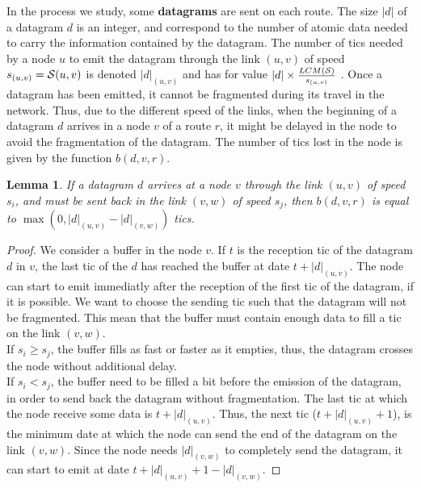 \documentclass[10pt]{article}
\newtheorem{lemma}[theorem]{Lemma}
\begin{document}
        In the process we study, some {\bf datagrams} are sent on each route. The size $|d|$ of a datagram $d$ is an integer, and correspond to the number of atomic data needed to carry the information contained by the datagram. The number of tics needed by a node $u$ to emit the datagram through the link $(u,v)$ of speed $s_{(u,v)} = {\cal S}(u,v)$ is denoted $|d|_{(u,v)}$ and has for value $ |d| \times \frac{LCM({\cal S})}{s_{(u,v)}}$ . Once a datagram has been emitted, it cannot be fragmented during its travel in the network. Thus, due to the different speed of the links, when the beginning of a datagram $d$ arrives in a node $v$ of a route $r$, it might be delayed in the node to avoid the fragmentation of the datagram. The number of tics lost in the node is given by the function $b(d,v,r)$.\\
        \begin{lemma}
        If a datagram $d$ arrives at a node $v$ through the link $(u,v)$ of speed $s_i$, and must be sent back in the link $(v,w)$ of speed $s_j$, then $b(d,v,r)$ is equal to $ \max( 0, |d|_{(u,v)} - |d|_{(v,w)} )$ tics.
        \end{lemma}
        \begin{proof}
        We consider a buffer in the node $v$. If $t$ is the reception tic of the datagram $d$ in $v$, the last tic of the $d$ has reached the buffer  at date $t+|d|_{(u,v)}$. The node can start to emit immediatly after the reception of the first tic of the datagram, if it is possible. We want to choose the sending tic such that the datagram will not be fragmented. This mean that the buffer must contain enough data to fill a tic on the link $(v,w)$.\\
        
        If $s_i \geq s_j$, the buffer fills as fast or faster as it empties, thus, the datagram crosses the node without additional delay.\\
   
        If $s_i < s_j$, the buffer need to be filled a bit before the emission of the datagram, in order to send back the datagram without fragmentation. The last tic at which the node receive some data is $t+|d|_{(u,v)}$. Thus, the next tic ($t+|d|_{(u,v)}+1$), is the minimum date at which the node can send the end of the datagram on the link $(v,w)$. Since the node needs $|d|_{(v,w)}$ to completely send the datagram, it can start to emit at date $t+|d|_{(u,v)}+ 1 - |d|_{(v,w)}$. 
        \end{proof}
        
\end{document}
